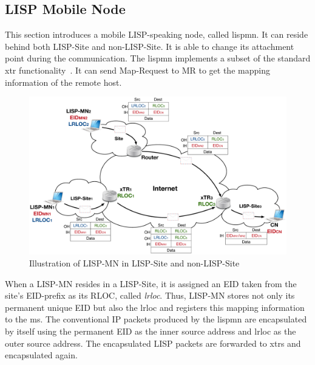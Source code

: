 \subsection{LISP Mobile Node}
\label{subsec:lispMN}
This section introduces a mobile LISP-speaking node, called \acrfull{lispmn}. It can reside behind both LISP-Site and non-LISP-Site. It is able to change its attachment point during the communication. The \acrshort{lispmn} implements a subset of the standard \acrshort{xtr} functionality~\cite{mn00}. It can send Map-Request to MR to get the mapping information of the remote host.

\begin{figure}[!t]
	\centering
	\includegraphics[width=\textwidth]{Pics/LISP-MN_archi.eps}
	\caption{Illustration of LISP-MN in LISP-Site and non-LISP-Site}
	\label{LISP_archi_2encap}
\end{figure}
When a LISP-MN resides in a LISP-Site, it is assigned an EID taken from the site's EID-prefix as its RLOC, called \emph{\acrfull{lrloc}}. Thus, LISP-MN stores not only its permanent unique EID but also the \acrshort{lrloc} and registers this mapping information to the \acrshort{ms}. The conventional IP packets produced by the \acrshort{lispmn} are encapsulated by itself using the permanent EID as the inner source address and \acrshort{lrloc} as the outer source address. The encapsulated LISP packets are forwarded to \acrshort{xtr}s and encapsulated again. %

